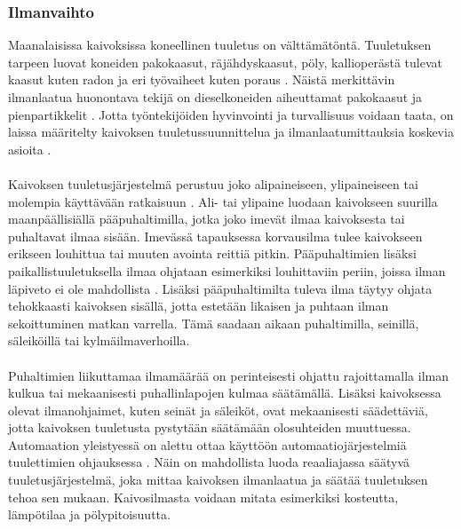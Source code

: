 \documentclass[finnish,12pt,a4paper,pdftex,elec,utf8]{aaltothesis}
\begin{document}

\subsubsection{Ilmanvaihto}
Maanalaisissa kaivoksissa koneellinen tuuletus on välttämätöntä. Tuuletuksen tarpeen luovat koneiden pakokaasut, räjähdyskaasut, pöly, kallioperästä tulevat kaasut kuten radon ja eri työvaiheet kuten poraus \cite[s. 290]{Hakapää}. Näistä merkittävin ilmanlaatua huonontava tekijä on dieselkoneiden aiheuttamat pakokaasut ja pienpartikkelit \cite[s. 290]{Hakapää}. Jotta työntekijöiden hyvinvointi ja turvallisuus voidaan taata, on laissa määritelty kaivoksen tuuletussuunnittelua ja ilmanlaatumittauksia koskevia asioita \cite[s. 285]{Hakapää}.
\\\\
Kaivoksen tuuletusjärjestelmä perustuu joko alipaineiseen, ylipaineiseen tai molempia käyttävään ratkaisuun \cite[s. 290]{Hakapää}. Ali- tai ylipaine luodaan kaivokseen suurilla maanpäällisiällä pääpuhaltimilla, jotka joko imevät ilmaa kaivoksesta tai puhaltavat ilmaa sisään. Imevässä tapauksessa korvausilma tulee kaivokseen erikseen louhittua tai muuten avointa reittiä pitkin. Pääpuhaltimien lisäksi paikallistuuletuksella ilmaa ohjataan esimerkiksi louhittaviin periin, joissa ilman läpiveto ei ole mahdollista \cite[s. 293]{Hakapää}. Lisäksi pääpuhaltimilta tuleva ilma täytyy ohjata tehokkaasti kaivoksen sisällä, jotta estetään likaisen ja puhtaan ilman sekoittuminen matkan varrella. Tämä saadaan aikaan puhaltimilla, seinillä, säleiköillä tai kylmäilmaverhoilla.
\\\\
Puhaltimien liikuttamaa ilmamäärää on perinteisesti ohjattu rajoittamalla ilman kulkua tai mekaanisesti puhallinlapojen kulmaa säätämällä. Lisäksi kaivoksessa olevat ilmanohjaimet, kuten seinät ja säleiköt, ovat mekaanisesti säädettäviä, jotta kaivoksen tuuletusta pystytään säätämään olosuhteiden muuttuessa. Automaation yleistyessä on alettu ottaa käyttöön automaatiojärjestelmiä tuulettimien ohjauksessa \cite[s. 300-301]{Hakapää}. Näin on mahdollista luoda reaaliajassa säätyvä tuuletusjärjestelmä, joka mittaa kaivoksen ilmanlaatua ja säätää tuuletuksen tehoa sen mukaan. Kaivosilmasta voidaan mitata esimerkiksi kosteutta, lämpötilaa ja pölypitoisuutta.
\end{document}
